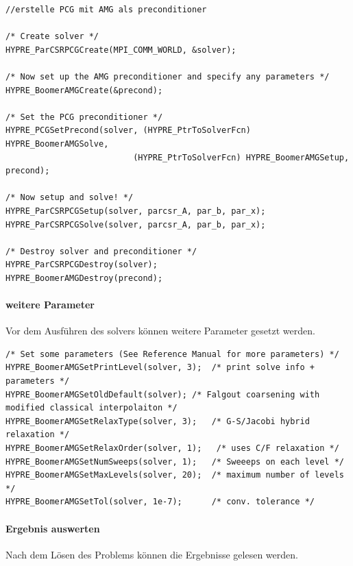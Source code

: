 \documentclass[a4paper,10pt]{article}
\begin{document}
\begin{lstlisting}[frame=single,caption=HYPRE Nutzung: Solver mit Preconditioner]
//erstelle PCG mit AMG als preconditioner

/* Create solver */
HYPRE_ParCSRPCGCreate(MPI_COMM_WORLD, &solver);

/* Now set up the AMG preconditioner and specify any parameters */
HYPRE_BoomerAMGCreate(&precond);

/* Set the PCG preconditioner */
HYPRE_PCGSetPrecond(solver, (HYPRE_PtrToSolverFcn) HYPRE_BoomerAMGSolve,
                          (HYPRE_PtrToSolverFcn) HYPRE_BoomerAMGSetup, precond);

/* Now setup and solve! */
HYPRE_ParCSRPCGSetup(solver, parcsr_A, par_b, par_x);
HYPRE_ParCSRPCGSolve(solver, parcsr_A, par_b, par_x);

/* Destroy solver and preconditioner */
HYPRE_ParCSRPCGDestroy(solver);
HYPRE_BoomerAMGDestroy(precond);

\end{lstlisting}

\paragraph{weitere Parameter}

Vor dem Ausführen des solvers können weitere Parameter gesetzt werden.

\begin{lstlisting}[frame=single,caption=HYPRE Nutzung: Solver mit Preconditioner]
/* Set some parameters (See Reference Manual for more parameters) */
HYPRE_BoomerAMGSetPrintLevel(solver, 3);  /* print solve info + parameters */
HYPRE_BoomerAMGSetOldDefault(solver); /* Falgout coarsening with modified classical interpolaiton */
HYPRE_BoomerAMGSetRelaxType(solver, 3);   /* G-S/Jacobi hybrid relaxation */
HYPRE_BoomerAMGSetRelaxOrder(solver, 1);   /* uses C/F relaxation */
HYPRE_BoomerAMGSetNumSweeps(solver, 1);   /* Sweeeps on each level */
HYPRE_BoomerAMGSetMaxLevels(solver, 20);  /* maximum number of levels */
HYPRE_BoomerAMGSetTol(solver, 1e-7);      /* conv. tolerance */
\end{lstlisting}

\paragraph{Ergebnis auswerten}

Nach dem Lösen des Problems können die Ergebnisse gelesen werden.
\end{document}
